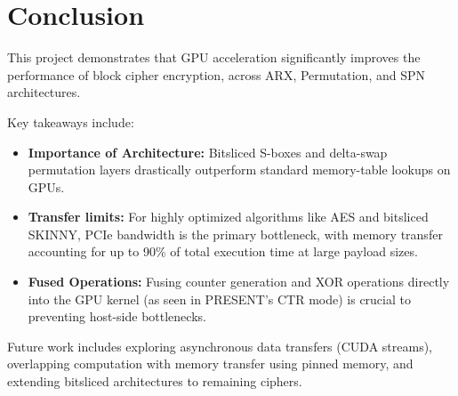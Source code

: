 \documentclass{article}
\begin{document}
\section{Conclusion}

This project demonstrates that GPU acceleration significantly improves the performance of block cipher encryption, across ARX, Permutation, and SPN architectures.

Key takeaways include:
\begin{itemize}
    \item \textbf{Importance of Architecture:} Bitsliced S-boxes and delta-swap permutation layers drastically outperform standard memory-table lookups on GPUs.
    \item \textbf{Transfer limits:} For highly optimized algorithms like AES and bitsliced SKINNY, PCIe bandwidth is the primary bottleneck, with memory transfer accounting for up to 90\% of total execution time at large payload sizes.
    \item \textbf{Fused Operations:} Fusing counter generation and XOR operations directly into the GPU kernel (as seen in PRESENT's CTR mode) is crucial to preventing host-side bottlenecks.
\end{itemize}

Future work includes exploring asynchronous data transfers (CUDA streams), overlapping computation with memory transfer using pinned memory, and extending bitsliced architectures to remaining ciphers.
\end{document}
